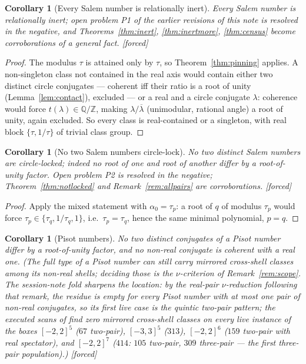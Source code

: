 \documentclass[11pt]{article}
\theoremstyle{plain}
\newtheorem{corollary}[theorem]{Corollary}
\theoremstyle{definition}
\theoremstyle{remark}
\newcommand{\Q}{\mathbb{Q}}
\newcommand{\Z}{\mathbb{Z}}
\newcommand{\F}{\textnormal{[forced]}}
\begin{document}
\begin{corollary}[Every Salem number is relationally inert]
\label{cor:allinert}
Every Salem number is relationally inert; open problem P1 of the earlier
revisions of this note is resolved in the negative, and
Theorems~\ref{thm:inert}, \ref{thm:inertmore}, \ref{thm:census} become
corroborations of a general fact. \F
\end{corollary}

\begin{proof}
The modulus $\tau$ is attained only by $\tau$, so
Theorem~\ref{thm:pinning} applies. A non-singleton class not contained in
the real axis would contain either two distinct circle conjugates ---
coherent iff their ratio is a root of unity (Lemma~\ref{lem:contact}),
excluded --- or a real and a circle conjugate $\lambda$: coherence would
force $t(\lambda)\in\Q/\Z$, making $\lambda/\overline{\lambda}$
(unimodular, rational angle) a root of unity, again excluded. So every
class is real-contained or a singleton, with real block $\{\tau,1/\tau\}$
of trivial class group.
\end{proof}

\begin{corollary}[No two Salem numbers circle-lock]\label{cor:nolock}
No two distinct Salem numbers are circle-locked; indeed no root of one and
root of another differ by a root-of-unity factor. Open problem P2 is
resolved in the negative; Theorem~\ref{thm:notlocked} and
Remark~\ref{rem:allpairs} are corroborations. \F
\end{corollary}

\begin{proof}
Apply the mixed statement with $\alpha_0=\tau_p$: a root of $q$ of modulus
$\tau_p$ would force $\tau_p\in\{\tau_q,1/\tau_q,1\}$, i.e.\
$\tau_p=\tau_q$, hence the same minimal polynomial, $p=q$.
\end{proof}

\begin{corollary}[Pisot numbers]\label{cor:pisot}
No two distinct conjugates of a Pisot number differ by a root-of-unity
factor, and no non-real conjugate is coherent with a real one. (The full
type of a Pisot number can still carry mirrored cross-shell classes among
its non-real shells; deciding those is the $\nu$-criterion of
Remark~\ref{rem:scope}. The session-note fold sharpens the location: by the
real-pair $\nu$-reduction following that remark, the residue is empty for every
Pisot number with at most one pair of non-real conjugates, so its first
live case is the quintic two-pair pattern; the executed scans of
\cite{pisotnote} find \emph{zero} mirrored cross-shell classes on every
live instance of the boxes $[-2,2]^5$ ($67$ two-pair), $[-3,3]^5$ ($313$),
$[-2,2]^6$ ($159$ two-pair with real spectator), and $[-2,2]^7$ ($414$:
$105$ two-pair, $309$ three-pair --- the first three-pair population).) \F
\end{corollary}
\end{document}
